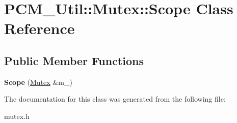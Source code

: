 \hypertarget{class_p_c_m___util_1_1_mutex_1_1_scope}{}\section{P\+C\+M\+\_\+\+Util\+:\+:Mutex\+:\+:Scope Class Reference}
\label{class_p_c_m___util_1_1_mutex_1_1_scope}
\subsection*{Public Member Functions}
\begin{DoxyCompactItemize}
\item 
\mbox{\label{class_p_c_m___util_1_1_mutex_1_1_scope_aaf42d670b42a014200ad176d60d7c226}} 
{\bfseries Scope} (\mbox{\hyperlink{class_p_c_m___util_1_1_mutex}{Mutex}} \&m\+\_\+)
\end{DoxyCompactItemize}


The documentation for this class was generated from the following file\+:\begin{DoxyCompactItemize}
\item 
mutex.\+h\end{DoxyCompactItemize}
